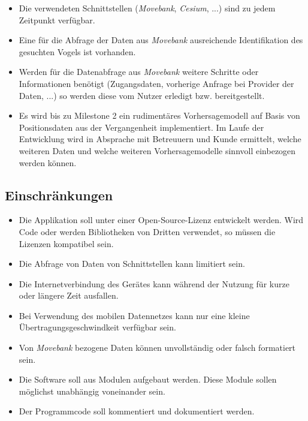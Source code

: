\documentclass[12pt]{article} %
\begin{document}

\begin{itemize} 
 	 \item Die verwendeten Schnittstellen (\textit{Movebank}, \textit{Cesium}, ...) sind zu jedem Zeitpunkt verfügbar.
 	 \item Eine für die Abfrage der Daten aus \textit{Movebank} ausreichende Identifikation des gesuchten Vogels ist vorhanden.
 	 \item Werden für die Datenabfrage aus \textit{Movebank} weitere Schritte oder Informationen benötigt (Zugangsdaten, vorherige Anfrage bei Provider der Daten, ...) so werden diese vom Nutzer erledigt bzw. bereitgestellt.
 	 \item Es wird bis zu Milestone 2 ein rudimentäres Vorhersagemodell auf Basis von Positionsdaten aus der Vergangenheit implementiert. Im Laufe der Entwicklung wird in Absprache mit Betreuuern und Kunde ermittelt, welche weiteren Daten und welche weiteren Vorhersagemodelle sinnvoll einbezogen werden können.
\end{itemize} 


\subsection{Einschränkungen}

\begin{itemize} 
	\item Die Applikation soll unter einer Open-Source-Lizenz entwickelt werden. Wird Code oder werden Bibliotheken von Dritten verwendet, so müssen die Lizenzen kompatibel sein.
	\item Die Abfrage von Daten von Schnittstellen kann limitiert sein.
	\item Die Internetverbindung des Gerätes kann während der Nutzung für kurze oder längere Zeit ausfallen.
	\item Bei Verwendung des mobilen Datennetzes kann nur eine kleine Übertragungsgeschwindkeit verfügbar sein.
	\item Von \textit{Movebank} bezogene Daten können unvollständig oder falsch formatiert sein.
	\item Die Software soll aus Modulen aufgebaut werden. Diese Module sollen möglichst unabhängig voneinander sein.
	\item Der Programmcode soll kommentiert und dokumentiert werden.
\end{itemize} 
\end{document}
